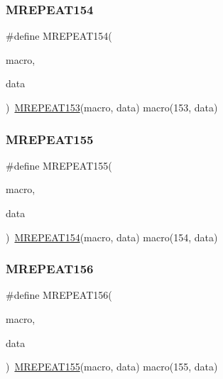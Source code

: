 \mbox{\label{group__group__sam0__utils__mrepeat_ga70ba0c83bec304aec635e40497033340}} 
\subsubsection{\texorpdfstring{MREPEAT154}{MREPEAT154}}
{\footnotesize\ttfamily \#define M\+R\+E\+P\+E\+A\+T154(\begin{DoxyParamCaption}\item[{}]{macro,  }\item[{}]{data }\end{DoxyParamCaption})~\mbox{\hyperlink{group__group__sam0__utils__mrepeat_gac8eb62a598002e65a7aee5ffce9daefb}{M\+R\+E\+P\+E\+A\+T153}}(macro, data)   macro(153, data)}

\mbox{\label{group__group__sam0__utils__mrepeat_gab9b1a8f988e6f8230241c06b25c09851}} 
\subsubsection{\texorpdfstring{MREPEAT155}{MREPEAT155}}
{\footnotesize\ttfamily \#define M\+R\+E\+P\+E\+A\+T155(\begin{DoxyParamCaption}\item[{}]{macro,  }\item[{}]{data }\end{DoxyParamCaption})~\mbox{\hyperlink{group__group__sam0__utils__mrepeat_ga70ba0c83bec304aec635e40497033340}{M\+R\+E\+P\+E\+A\+T154}}(macro, data)   macro(154, data)}

\mbox{\label{group__group__sam0__utils__mrepeat_ga4608d896f8fb7879075ba32ad5b687f9}} 
\subsubsection{\texorpdfstring{MREPEAT156}{MREPEAT156}}
{\footnotesize\ttfamily \#define M\+R\+E\+P\+E\+A\+T156(\begin{DoxyParamCaption}\item[{}]{macro,  }\item[{}]{data }\end{DoxyParamCaption})~\mbox{\hyperlink{group__group__sam0__utils__mrepeat_gab9b1a8f988e6f8230241c06b25c09851}{M\+R\+E\+P\+E\+A\+T155}}(macro, data)   macro(155, data)}

